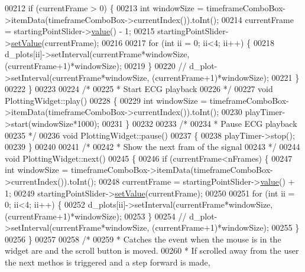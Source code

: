 \begin{DoxyCode}
00212     \textcolor{keywordflow}{if} (currentFrame > 0) \{
00213         \textcolor{keywordtype}{int} windowSize = timeframeComboBox->itemData(timeframeComboBox->currentIndex()).toInt();
00214         currentFrame = startingPointSlider->\hyperlink{classSliderWidget_a05ed61d5bb79a82da1f51f73b5e2466a}{value}() - 1;
00215         startingPointSlider->\hyperlink{classSliderWidget_ad69dd98151b2132011341f7ae7799480}{setValue}(currentFrame);
00216 
00217         \textcolor{keywordflow}{for} (\textcolor{keywordtype}{int} ii = 0; ii<4; ii++) \{
00218             d\_plots[ii]->setInterval(currentFrame*windowSize, (currentFrame+1)*windowSize);
00219         \}
00220         \textcolor{comment}{// d\_plot->setInterval(currentFrame*windowSize, (currentFrame+1)*windowSize);}
00221     \}
00222 \}
00223 
00224 \textcolor{comment}{/*}
00225 \textcolor{comment}{ * Start ECG playback}
00226 \textcolor{comment}{ */}
00227 \textcolor{keywordtype}{void} PlottingWidget::play()
00228 \{
00229     \textcolor{keywordtype}{int} windowSize = timeframeComboBox->itemData(timeframeComboBox->currentIndex()).toInt();
00230     playTimer->start(windowSize*1000);
00231 \}
00232 
00233 \textcolor{comment}{/*}
00234 \textcolor{comment}{ * Pause ECG playback}
00235 \textcolor{comment}{ */}
00236 \textcolor{keywordtype}{void} PlottingWidget::pause()
00237 \{
00238     playTimer->stop();
00239 \}
00240 
00241 \textcolor{comment}{/*}
00242 \textcolor{comment}{ * Show the next fram of the signal}
00243 \textcolor{comment}{ */}
00244 \textcolor{keywordtype}{void} PlottingWidget::next()
00245 \{
00246     \textcolor{keywordflow}{if} (currentFrame<nFrames) \{
00247         \textcolor{keywordtype}{int} windowSize = timeframeComboBox->itemData(timeframeComboBox->currentIndex()).toInt();
00248         currentFrame = startingPointSlider->\hyperlink{classSliderWidget_a05ed61d5bb79a82da1f51f73b5e2466a}{value}() + 1;
00249         startingPointSlider->\hyperlink{classSliderWidget_ad69dd98151b2132011341f7ae7799480}{setValue}(currentFrame);
00250 
00251         \textcolor{keywordflow}{for} (\textcolor{keywordtype}{int} ii = 0; ii<4; ii++) \{
00252             d\_plots[ii]->setInterval(currentFrame*windowSize, (currentFrame+1)*windowSize);
00253         \}
00254         \textcolor{comment}{// d\_plot->setInterval(currentFrame*windowSize, (currentFrame+1)*windowSize);}
00255     \}
00256 \}
00257 
00258 \textcolor{comment}{/*}
00259 \textcolor{comment}{ * Catches the event when the mouse is in the widget are and the scroll button is moved.}
00260 \textcolor{comment}{ * If scrolled away from the user the next methos is triggered and a step forward is made,}

\end{DoxyCode}
